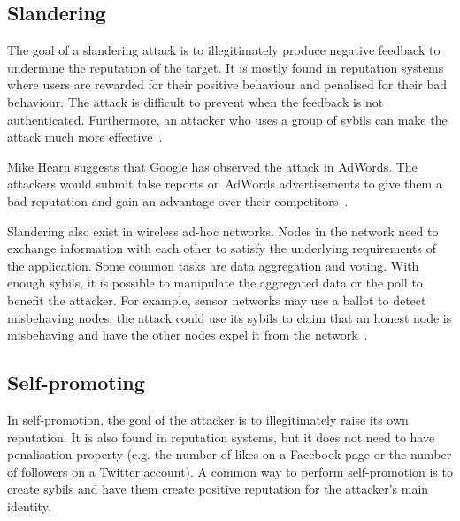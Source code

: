 \subsection{Slandering}
The goal of a slandering attack is to illegitimately produce negative feedback
to undermine the reputation of the target. It is mostly found in reputation
systems where users are rewarded for their positive behaviour and penalised for
their bad behaviour. The attack is difficult to prevent when the feedback is not
authenticated. Furthermore, an attacker who uses a group of sybils can make the
attack much more effective~\cite{hoffman2009survey}.

Mike Hearn suggests that Google has observed the attack in AdWords. The
attackers would submit false reports on AdWords advertisements to give them a
bad reputation and gain an advantage over their competitors~\cite{adwords}.

Slandering also exist in wireless ad-hoc networks. Nodes in the network need to
exchange information with each other to satisfy the underlying requirements of
the application. Some common tasks are data aggregation and voting. With enough
sybils, it is possible to manipulate the aggregated data or the poll to benefit
the attacker. For example, sensor networks may use a ballot to detect
misbehaving nodes, the attack could use its sybils to claim that an honest node
is misbehaving and have the other nodes expel it from the
network~\cite{newsome2004sybil}.

\subsection{Self-promoting}
In self-promotion, the goal of the attacker is to illegitimately raise its own
reputation. It is also found in reputation systems, but it does not need to have
penalisation property (e.g. the number of likes on a Facebook page or the number
of followers on a Twitter account). A common way to perform self-promotion is to
create sybils and have them create positive reputation for the attacker's main
identity.

\begin{comment}
Dini and Spagnolo studied the economics of buying reputation on eBay. The
authors discovered many cheap items (around \euro{0.7}) for sell are simply there to
boost feedback. For example, one of the item is titled ``Apple Cranberry Crisp
Recipe + 100\% Positive Feedback''. The authors successfully boosted their
feedback by purchasing such items. But they made an unsuccessful attempted to
place a bid on their own good with a fake account~\cite{dini2009buying}.
\end{comment}

